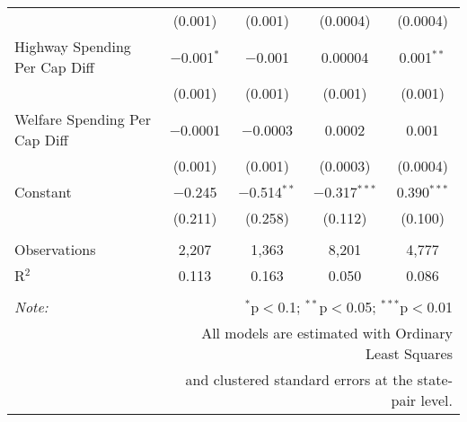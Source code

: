 \begin{table}[!htbp]
\begin{tabular}{@{\extracolsep{5pt}}lcccc}
  & (0.001) & (0.001) & (0.0004) & (0.0004) \\ 
  Highway Spending Per Cap Diff & $-$0.001$^{*}$ & $-$0.001 & 0.00004 & 0.001$^{**}$ \\ 
  & (0.001) & (0.001) & (0.001) & (0.001) \\ 
  Welfare Spending Per Cap Diff & $-$0.0001 & $-$0.0003 & 0.0002 & 0.001 \\ 
  & (0.001) & (0.001) & (0.0003) & (0.0004) \\ 
  Constant & $-$0.245 & $-$0.514$^{**}$ & $-$0.317$^{***}$ & 0.390$^{***}$ \\ 
  & (0.211) & (0.258) & (0.112) & (0.100) \\ 
 \hline \\[-1.8ex] 
Observations & 2,207 & 1,363 & 8,201 & 4,777 \\ 
R$^{2}$ & 0.113 & 0.163 & 0.050 & 0.086 \\ 
\hline 
\hline \\[-1.8ex] 
\textit{Note:}  & \multicolumn{4}{r}{$^{*}$p$<$0.1; $^{**}$p$<$0.05; $^{***}$p$<$0.01} \\ 
 & \multicolumn{4}{r}{All models are estimated with Ordinary Least Squares} \\ 
 & \multicolumn{4}{r}{and clustered standard errors at the state-pair level.} \\ 
\end{tabular} 
\end{table} 
